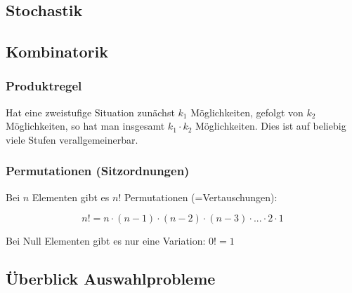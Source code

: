 \begin{multicols}{2}
\section*{Stochastik}

\subsection*{Kombinatorik}

\subsubsection*{Produktregel}
Hat eine zweistufige Situation zunächst $k_1$ Möglichkeiten, gefolgt
von $k_2$ Möglichkeiten, so hat man insgesamt $k_1\cdot{}k_2$
Möglichkeiten. Dies ist auf beliebig viele Stufen verallgemeinerbar.


\subsubsection*{Permutationen (Sitzordnungen)}

Bei $n$ Elementen gibt es $n!$ Permutationen (=Vertauschungen):

\begin{definition*}{}{}
$$n! = n\cdot{}(n-1)\cdot{}(n-2)\cdot{}(n-3)\cdot{} ... \cdot{}2\cdot{}1$$
\end{definition*}

Bei Null Elementen gibt es nur eine Variation: $0! = 1$


\end{multicols}




\subsection*{Überblick Auswahlprobleme}

\hrulefill



